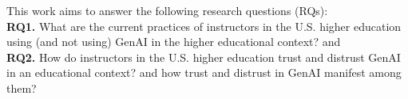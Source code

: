 This work aims to answer the following research questions (RQs): \\
    \textbf{RQ1.} What are the current practices of instructors in the U.S. higher education using (and not using) GenAI in the higher educational context? and \\
    \textbf{RQ2.} How do instructors in the U.S. higher education trust and distrust GenAI in an educational context? and how trust and distrust in GenAI manifest among them? 


